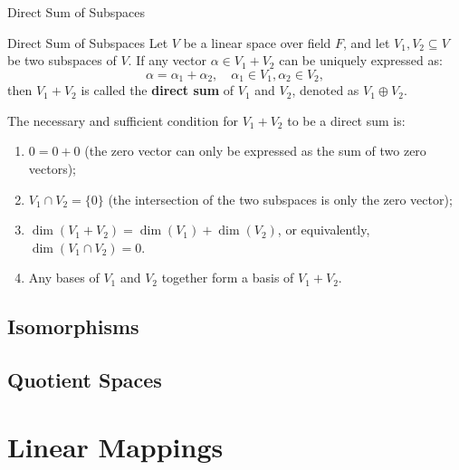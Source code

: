\documentclass[11pt]{../../TexTemplate/elegantbook} %
\begin{document}
\begin{leftbarTitle}{Direct Sum of Subspaces}\end{leftbarTitle}
\begin{definition}{Direct Sum of Subspaces}
    Let \( V \) be a linear space over field \( F \), 
    and let \( V_1, V_2 \subseteq V \) be two subspaces of \( V \).
    If any vector \( \alpha \in V_1 + V_2 \) can be uniquely expressed as:
    \[
    \alpha = \alpha_1 + \alpha_2, \quad \alpha_1 \in V_1, \alpha_2 \in V_2,
    \]
    then \( V_1 + V_2 \) is called the \textbf{direct sum} of \( V_1 \) and \( V_2 \),
    denoted as \( V_1 \oplus V_2 \).
\end{definition}

\begin{proposition}
    The necessary and sufficient condition for \( V_1 + V_2 \) to be a direct sum is:
    \begin{enumerate}
        \item \(0 = 0 + 0\) (the zero vector can only be expressed as the sum of two zero vectors); 
        \item \( V_1 \cap V_2 = \{0\} \) (the intersection of the two subspaces is only the zero vector);
        \item \(\operatorname{dim}(V_{1}+V_{2})=\operatorname{dim}(V_{1})+\operatorname{dim}(V_{2})\),
            or equivalently, \(\operatorname{dim}(V_{1} \cap V_{2})=0\).
        \item Any bases of \( V_1 \) and \( V_2 \) together form a basis of \( V_1 + V_2 \).
    \end{enumerate}
\end{proposition}




\section{Isomorphisms}

\section{Quotient Spaces}

\chapter{Linear Mappings}
\end{document}
